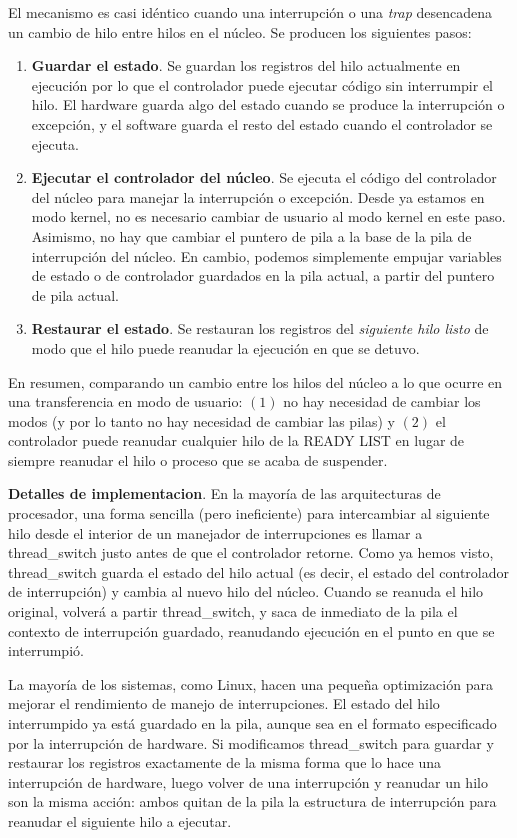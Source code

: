 \documentclass[10pt]{book}
\begin{document}
El mecanismo es casi idéntico cuando una interrupción o una \textit{trap} desencadena un cambio de hilo entre hilos en el núcleo. Se producen los siguientes pasos:
\begin{enumerate}
\item \textbf{Guardar el estado}. Se guardan los registros del hilo actualmente en ejecución por lo que el controlador puede ejecutar código sin interrumpir el hilo. El hardware guarda algo del estado cuando se produce la interrupción o excepción, y el software guarda el resto del estado cuando el controlador se ejecuta.

\item \textbf{Ejecutar el controlador del núcleo}. Se ejecuta el código del controlador del núcleo para manejar la interrupción o excepción. Desde ya estamos en modo kernel, no es necesario cambiar de usuario al modo kernel en este paso. Asimismo, no hay que cambiar el puntero de pila a la base de la pila de interrupción del núcleo. En cambio, podemos simplemente empujar variables de estado o de controlador guardados en la pila actual, a partir del puntero de pila actual.

\item \textbf{Restaurar el estado}. Se restauran los registros del \textit{siguiente hilo listo} de modo que el hilo puede reanudar la ejecución en que se detuvo.
\end{enumerate}

En resumen, comparando un cambio entre los hilos del núcleo a lo que ocurre en una transferencia en modo de usuario: $(1)$ no hay necesidad de cambiar los modos (y por lo tanto no hay necesidad de cambiar las pilas) y $(2)$ el controlador puede reanudar cualquier hilo de la READY LIST en lugar de siempre reanudar el hilo o proceso que se acaba de suspender.

\textbf{Detalles de implementacion}. En la mayoría de las arquitecturas de procesador, una forma sencilla (pero ineficiente) para intercambiar al siguiente hilo desde el interior de un manejador de interrupciones es llamar a {\mf thread\_switch} justo antes de que el controlador retorne. Como ya hemos visto, {\mf thread\_switch} guarda el estado del hilo actual (es decir, el estado del controlador de interrupción) y cambia al nuevo hilo del núcleo. Cuando se reanuda el hilo original, volverá a partir {\mf thread\_switch}, y saca de inmediato de la pila el contexto de interrupción guardado, reanudando ejecución en el punto en que se interrumpió.

La mayoría de los sistemas, como Linux, hacen una pequeña optimización para mejorar el rendimiento de manejo de interrupciones. El estado del hilo interrumpido ya está guardado en la pila, aunque sea en el formato especificado por la interrupción de hardware. Si modificamos {\mf thread\_switch} para guardar y restaurar los registros exactamente de la misma forma que lo hace una interrupción de hardware, luego volver de una interrupción y reanudar un hilo son la misma acción: ambos quitan de la pila la estructura de interrupción para reanudar el siguiente hilo a ejecutar.
\end{document}

